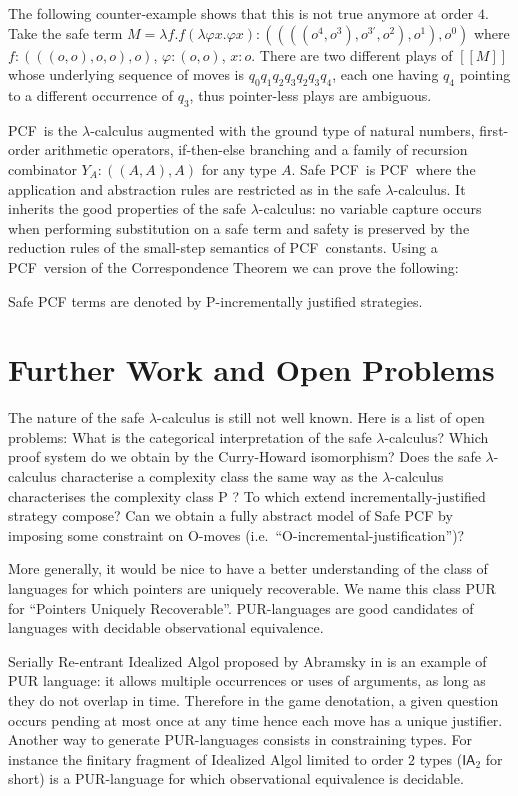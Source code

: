 \documentclass{llncs}
\newcommand{\sem}[1]{{[\![ #1 ]\!]}}
\newcommand\ialgol{\textsf{IA}}
\newcommand\pcf{\textsf{PCF}}
\begin{document}
The following counter-example shows that this is not true anymore at order $4$. Take the safe term $M = \lambda f . f (\lambda \varphi x . \varphi x) : ((((o^4,o^3),o^{3'},o^2),o^1),o^0)$ where $f:(((o,o),o,o),o)$, $\varphi:(o,o)$, $x:o$. There are two different plays of $\sem{M}$ whose underlying sequence of moves is $q_0 q_1 q_2 q_3 q_2 q_3 q_4$, each one having $q_4$ pointing to a different occurrence of $q_3$, thus pointer-less plays are ambiguous.


\pcf\ is the $\lambda$-calculus augmented with the ground type of natural numbers, first-order arithmetic operators, if-then-else branching
and a family of recursion combinator $Y_A : ((A,A),A)$ for any type $A$.
Safe \pcf\ is \pcf\ where the application and abstraction rules are restricted as in the safe $\lambda$-calculus.
It inherits the good properties of the safe $\lambda$-calculus: no variable capture occurs when performing substitution on a safe term and safety is preserved by the reduction rules of the small-step semantics of \pcf\ constants. Using a \pcf\ version of the Correspondence Theorem we can prove the following:
\begin{theorem}
\label{thm:safepcfpincr}
Safe PCF terms are denoted by P-incrementally justified strategies.
\end{theorem}


\section{Further Work and Open Problems}

The nature of the safe $\lambda$-calculus is still not well known. Here is a list of open problems:
What is the categorical interpretation of the safe $\lambda$-calculus? Which proof system do we obtain by the Curry-Howard isomorphism? Does the safe $\lambda$-calculus characterise a complexity class the same way as the $\lambda$-calculus characterises the complexity class P \cite{DBLP:conf/tlca/LeivantM93}?
To which extend incrementally-justified strategy compose? Can we obtain a fully abstract model of Safe PCF by imposing some constraint on O-moves (i.e.\ ``O-incremental-justification'')?

More generally, it would be nice to have a better understanding of the class of languages for which pointers are uniquely recoverable. We name this class PUR for ``Pointers Uniquely Recoverable''. PUR-languages are good candidates of languages with decidable observational equivalence.

Serially Re-entrant Idealized Algol proposed by Abramsky  in \cite{abramsky:mchecking_ia} is an example of PUR language: it allows multiple occurrences or uses of arguments, as long as they do not overlap in time. Therefore in the game denotation, a given question occurs pending at most once at any time hence each move has a unique justifier. Another way to generate PUR-languages consists in constraining types. For instance the finitary fragment of Idealized Algol \cite{Reynolds81}  limited to order $2$ types ($\ialgol_2$ for short) is a PUR-language for which observational equivalence is decidable.
\end{document}

